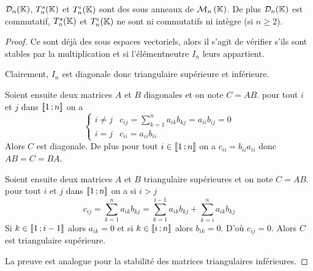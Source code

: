 \begin{prop}
  \(\mathcal{D}_n(\mathbb{K})\), \(T_n^s(\mathbb{K})\) et \(T_n^i(\mathbb{K})\) sont des sous anneaux de \(\mathcal{M}_{n}\left(\mathbb{K}\right)\). De plus \(\mathcal{D}_n(\mathbb{K})\) est commutatif, \(T_n^s(\mathbb{K})\) et \(T_n^i(\mathbb{K})\) ne sont ni commutatifs ni intègre (si \(n \geqslant 2\)).
\end{prop}
\begin{proof}
  Ce sont déjà des sous espaces vectoriels, alors il s'agit de vérifier s'ils sont stables par la multiplication et si l'élémentneutre \(I_n\) leurs appartient.

  Clairement, \(I_n\) est diagonale donc triangulaire supérieure et inférieure. 

  Soient ensuite deux matrices \(A\) et \(B\) diagonales et on note \(C=AB\). pour tout \(i\) et \(j\) dans \(\mathopen{\llbracket}1\mathclose{}\mathpunct{};n\mathclose{\rrbracket}\) on a
  \begin{equation}
    \begin{cases}
      i \neq j & c_{ij} = \sum_{k=1}^n a_{ik}b_{kj}=a_{ii}b_{ij}=0 \\
      i=j & c_{ii}=a_{ii}b_{ii}
    \end{cases}
  \end{equation}
  Alors \(C\) est diagonale. De plus pour tout \(i \in \mathopen{\llbracket}1\mathclose{}\mathpunct{};n\mathclose{\rrbracket}\) on a \(c_{ii}=b_{ii}a_{ii}\) donc \(AB=C=BA\). 

  Soient ensuite deux matrices \(A\) et \(B\) triangulaire supérieures et on note \(C=AB\). pour tout \(i\) et \(j\) dans \(\mathopen{\llbracket}1\mathclose{}\mathpunct{};n\mathclose{\rrbracket}\) on a si \(i > j\)
  \begin{equation}
    c_{ij}=\sum_{k=1}^n a_{ik} b_{kj} = \sum_{k=1}^{i-1} a_{ik} b_{kj} + \sum_{k=i}^{n} a_{ik} b_{kj}
  \end{equation}
  Si \(k \in \mathopen{\llbracket}1\mathclose{}\mathpunct{};i-1\mathclose{\rrbracket}\) alors \(a_{ik}=0\) et si \(k \in \mathopen{\llbracket}i\mathclose{}\mathpunct{};n\mathclose{\rrbracket}\) alors \(b_{ik}=0\). D'où \(c_{ij}=0\). Alors \(C\) est triangulaire supérieure.

  La preuve est analogue pour la stabilité des matrices triangulaires inférieures.
\end{proof}

